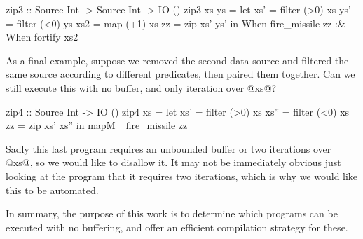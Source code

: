 \begin{code}
zip3 :: Source Int -> Source Int -> IO ()
zip3 xs ys
 = let xs'  = filter (>0) xs
       ys'  = filter (<0) ys
       xs2  = map    (+1) xs
       zz   = zip xs' ys'
   in  When fire_missile zz
   :&  When fortify      xs2
\end{code}

As a final example, suppose we removed the second data source and filtered the same source according to different predicates, then paired them together.
Can we still execute this with no buffer, and only iteration over @xs@?

\begin{code}
zip4 :: Source Int -> IO ()
zip4 xs
 = let xs'  = filter (>0) xs
       xs'' = filter (<0) xs
       zz   = zip xs' xs''
   in  mapM_ fire_missile zz
\end{code}

Sadly this last program requires an unbounded buffer or two iterations over @xs@, so we would like to disallow it.
It may not be immediately obvious just looking at the program that it requires two iterations, which is why we would like this to be automated.

In summary, the purpose of this work is to determine which programs can be executed with no buffering, and offer an efficient compilation strategy for these.

